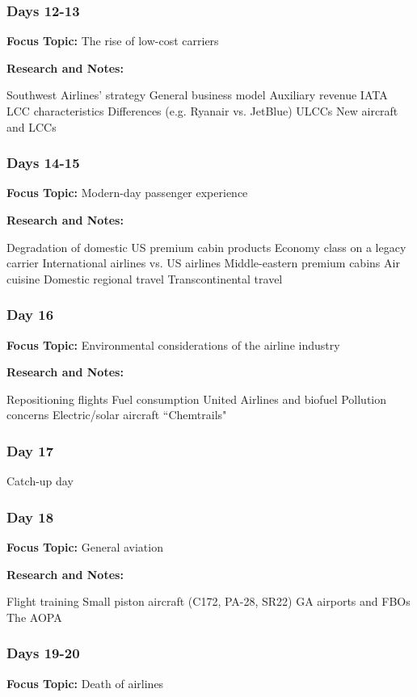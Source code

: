 \documentclass[12pt]{article}
\begin{document}
\subsubsection{Days 12-13}
\textbf{Focus Topic:} The rise of low-cost carriers

\textbf{Research and Notes:}
\begin{outline}
    \1 Southwest Airlines' strategy
\1 General business model
\1 Auxiliary revenue
\1 IATA LCC characteristics
\1 Differences (e.g. Ryanair vs. JetBlue)
\1 ULCCs
\1 New aircraft and LCCs
\end{outline}

\subsubsection{Days 14-15}
\textbf{Focus Topic:} Modern-day passenger experience

\textbf{Research and Notes:}
\begin{outline}
    \1 Degradation of domestic US premium cabin products
\1 Economy class on a legacy carrier
\1 International airlines vs. US airlines
\1 Middle-eastern premium cabins
\1 Air cuisine
\1 Domestic regional travel
\1 Transcontinental travel
\end{outline}
\subsubsection{Day 16}
\textbf{Focus Topic:} Environmental considerations of the airline industry

\textbf{Research and Notes:}
\begin{outline}
    \1 Repositioning flights
\1 Fuel consumption
\2 United Airlines and biofuel
\1 Pollution concerns
\1 Electric/solar aircraft
\1 ``Chemtrails"
\end{outline}
\subsubsection{Day 17}
Catch-up day 
\subsubsection{Day 18}
\textbf{Focus Topic:} General aviation

\textbf{Research and Notes:}
\begin{outline}
    \1 Flight training
\1 Small piston aircraft (C172, PA-28, SR22)
\1 GA airports and FBOs
\1 The AOPA
\end{outline}
\subsubsection{Days 19-20}
\textbf{Focus Topic:} Death of airlines
\end{document}
